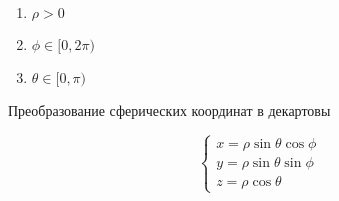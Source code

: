 \begin{twocolumns}

  \begin{enumerate}
  \item
    \(\rho > 0\)
    
  \item
    \(\phi \in [0, 2 \pi)\)
    
  \item
    \(\theta \in [0, \pi)\)
  \end{enumerate}

  Преобразование сферических координат в декартовы

  \begin{equation*}
    \begin{cases}
      x = \rho \sin \theta \cos \phi \\
      y = \rho \sin \theta \sin \phi \\
      z = \rho \cos \theta
    \end{cases}
  \end{equation*}
\end{twocolumns}
